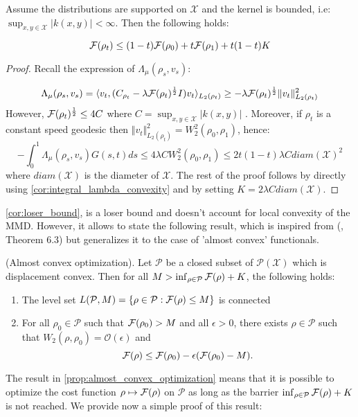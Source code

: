%
\begin{corollary}
\label{cor:loser_bound}Assume the distributions are supported on
$\mathcal{X}$ and the kernel is bounded, i.e: $\sup_{x,y\in\mathcal{X}}\vert k(x,y)\vert<\infty$.
Then the following holds:

\[
{{\mathcal F}}(\rho_{t})\leq(1-t){{\mathcal F}}(\rho_{0})+t{{\mathcal F}}(\rho_{1})+t(1-t)K
\]
\end{corollary}
%
\begin{proof}
Recall the expression of $\Lambda_{\mu}(\rho_{s},v_{s}):$

\[
\Lambda_{\mu}(\rho_{s},v_{s})=\langle v_{t},(C_{\rho_{t}}-\lambda {{\mathcal F}}(\rho_{t})^\frac{1}{2} I)v_{t}\rangle_{L_{2}(\rho_{t})}\geq-\lambda {{\mathcal F}}(\rho_{t})^\frac{1}{2}\Vert v_{t}\Vert_{L_{2}(\rho_{t})}^{2}
\]
However, ${{\mathcal F}}(\rho_{t})^\frac{1}{2}\leq4C$ where $C=\sup_{x,y\in\mathcal{X}}\vert k(x,y)\vert$
. Moreover, if $\rho_{t}$ is a constant speed geodesic then $\Vert v_{t}\Vert_{L_{2}(\rho_{t})}^{2}=W_{2}^{2}(\rho_{0},\rho_{1})$,
hence: 
\[
-\int_{0}^{1}\Lambda_{\mu}(\rho_{s},v_{s})G(s,t)ds\leq4\lambda CW_{2}^{2}(\rho_{0},\rho_{1})\leq2t(1-t)\lambda Cdiam(\mathcal{X})^{2}
\]
where $diam(\mathcal{X})$ is the diameter of $\mathcal{X}$. The rest of the proof follows by directly using \cref{cor:integral_lambda_convexity}
and by setting $K=2\lambda Cdiam(\mathcal{X})$.
\end{proof}
%
\cref{cor:loser_bound}, is a loser bound and doesn't account for local
convexity of the MMD. However, it allows to state the following result,
which is inspired from (\cite{Bottou:2017}, Theorem 6.3) but generalizes
it to the case of 'almost convex' functionals.
\begin{proposition}
\label{prop:almost_convex_optimization}
(Almost convex optimization). Let $\mathcal{P}$ be a closed subset
of $\mathcal{P}(\mathcal{X})$ which is displacement convex. Then
for all $M>\inf_{\rho\in\mathcal{P}}{{\mathcal F}}(\rho)+K$, the following
holds:
\end{proposition}
\begin{enumerate}
\item The level set $L(\mathcal{P},M)=\{\rho\in\mathcal{P}:{{\mathcal F}}(\rho)\leq M\}$
is connected
\item For all $\rho_{0}\in\mathcal{P}$ such that ${{\mathcal F}}(\rho_0)>M$
and all $\epsilon>0$, there exists $\rho\in\mathcal{P}$ such that
$W_{2}(\rho,\rho_{0})=\mathcal{O}(\epsilon)$ and
\[
{{\mathcal F}}(\rho)\leq {{\mathcal F}}(\rho_{0})-\epsilon({{\mathcal F}}(\rho_{0})-M).
\]
\end{enumerate}
%
\begin{remark}
The result in \cref{prop:almost_convex_optimization} means that it is possible to optimize the cost function $\rho\mapsto {{\mathcal F}}(\rho)$
on $\mathcal{P}$ as long as the barrier $\inf_{\rho\in\mathcal{P}}{{\mathcal F}}(\rho)+K$
is not reached. We provide now a simple proof of this result:
\end{remark}
